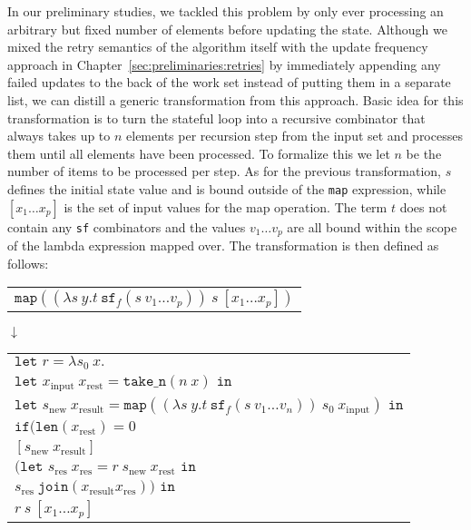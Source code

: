 In our preliminary studies, we tackled this problem by only ever processing an arbitrary but fixed number of elements before updating the state.
Although we mixed the retry semantics of the algorithm itself with the update frequency approach in Chapter~\ref{sec:preliminaries:retries} by immediately appending any failed updates to the back of the work set instead of putting them in a separate list, we can distill a generic transformation from this approach.
Basic idea for this transformation is to turn the stateful loop into a recursive combinator that always takes up to $n$ elements per recursion step from the input set and processes them until all elements have been processed.
To formalize this we let $n$ be the number of items to be processed per step.
As for the previous transformation, $s$ defines the initial state value and is bound outside of the \texttt{map} expression, while $[x_1 \dots x_p]$ is the set of input values for the map operation.
The term $t$ does not contain any \texttt{sf} combinators and the values $v_1 \dots v_p$ are all bound within the scope of the lambda expression mapped over.
The transformation is then defined as follows:
\begin{center}
    \begin{tabular}{l}
        $\texttt{map} ((\lambda s\ y.t\ \texttt{sf}_f(s\ v_1 \dots v_p))\ s\ [x_1 \dots x_p])$\\
    \end{tabular}

    $\downarrow$

    \begin{tabular}{l}
        $\texttt{let } r = \lambda s_0\ x.$\\
        \hspace*{.3cm}$\texttt{let } x_\text{input}\ x_\text{rest} = \texttt{take\_n}( n\ x) \texttt{ in}$\\
        \hspace*{.6cm}$\texttt{let } s_\text{new}\ x_\text{result} = \texttt{map} ((\lambda s\ y.t\ \texttt{sf}_f(s\ v_1 \dots v_n))\ s_0 \ x_\text{input}) \texttt{ in}$\\
        \hspace*{.9cm}$\texttt{if} (\texttt{len} (x_\text{rest}) = 0$\\
        \hspace*{1.5cm}$[s_\text{new}\ x_\text{result}]$\\
        \hspace*{1.5cm}$(\texttt{let } s_\text{res}\ x_\text{res} = r\ s_\text{new} \ x_\text{rest} \texttt{ in}$\\
        \hspace*{1.8cm}$s_\text{res}\ \texttt{join} (x_\text{result} x_\text{res})) \texttt{ in}$\\
        \hspace*{.3cm}$r \ s \ [x_1 \dots x_p]$
    \end{tabular}
\end{center}

